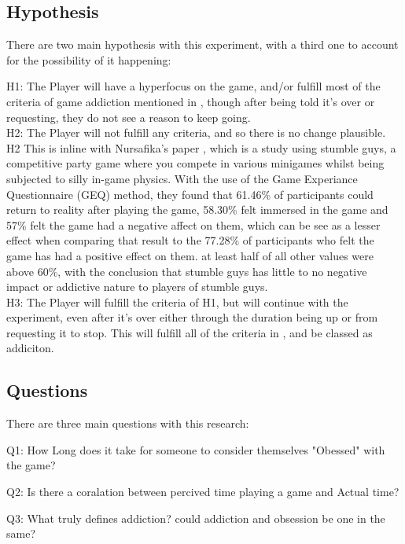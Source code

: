 \documentclass[conference]{IEEEtran}
\begin{document}
\subsection{Hypothesis}
There are two main hypothesis with this experiment, with a third one to account for the possibility of it happening:

H1: The Player will have a hyperfocus on the game, and/or fulfill most of the criteria of game addiction mentioned in \cite{NHSHamp24}, though after being told it's over or requesting, they do not see a reason to keep going.\\

H2: The Player will not fulfill any criteria, and so there is no change plausible.\\

H2 This is inline with Nursafika's paper \cite{Nursafika2024}, which is a study using stumble guys, a competitive party game where you compete in various minigames whilst being subjected to silly in-game physics. With the use of the Game Experiance Questionnaire (GEQ) method, they found that 61.46\% of participants could return to reality after playing the game, 58.30\% felt immersed in the game and 57\% felt the game had a negative affect on them, which can be see as a lesser effect when comparing that result to the 77.28\% of participants who felt the game has had a positive effect on them. at least half of all other values were above 60\%,  with the conclusion that stumble guys has little to no negative impact or addictive nature to players of stumble guys.\\

H3: The Player will fulfill the criteria of H1, but will continue with the experiment, even after it's over either through the duration being up or from requesting it to stop. This will fulfill all of the criteria in \cite{NHSHamp24}, and be classed as addiciton. \\
\subsection{Questions}
There are three main questions with this research:

Q1: How Long does it take for someone to consider themselves "Obessed" with the game?

Q2: Is there a coralation between percived time playing a game and Actual time?

Q3: What truly defines addiction? could addiction and obsession be one in the same?\\
\end{document}
